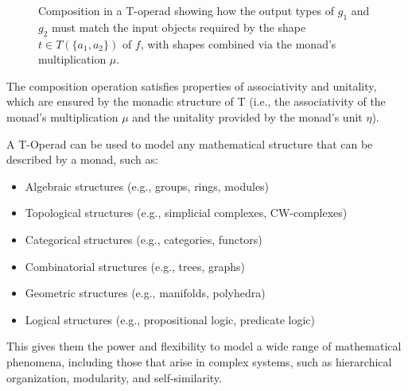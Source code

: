 \begin{figure}[h]
\centering
{}
\caption{Composition in a T-operad showing how the output types of $g_1$ and $g_2$ must match the input objects required by the shape $t \in T(\{a_1, a_2\})$ of $f$, with shapes combined via the monad's multiplication $\mu$.}
\label{fig:t-operadic-composition}
\end{figure}

The composition operation satisfies properties of associativity and unitality, which are ensured by the monadic structure of T (i.e., the associativity of the monad's multiplication $\mu$ and the unitality provided by the monad's unit $\eta$).

A T-Operad can be used to model any mathematical structure that can be described by a monad, such as:
\begin{itemize}
    \item Algebraic structures (e.g., groups, rings, modules)
    \item Topological structures (e.g., simplicial complexes, CW-complexes)
    \item Categorical structures (e.g., categories, functors)
    \item Combinatorial structures (e.g., trees, graphs)
    \item Geometric structures (e.g., manifolds, polyhedra)
    \item Logical structures (e.g., propositional logic, predicate logic)
\end{itemize}

This gives them the power and flexibility to model a wide range of mathematical phenomena, including those that arise in complex systems, such as hierarchical organization, modularity, and self-similarity.

